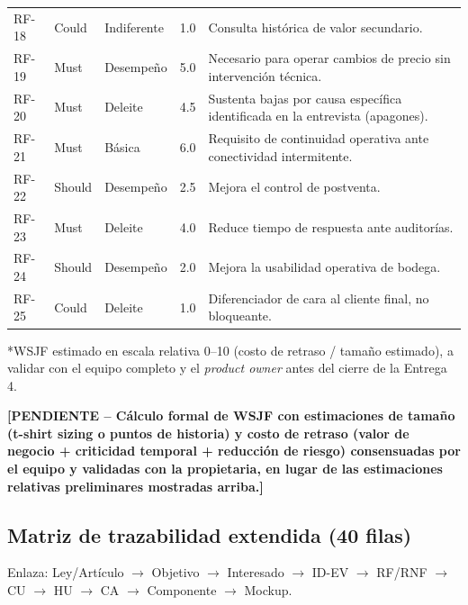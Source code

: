 \documentclass[11pt,a4paper]{article}
\newcommand{\PENDIENTE}[1]{\textcolor{pendiente}{\textbf{[PENDIENTE -- #1]}}}
\begin{document}
\begin{longtable}{|p{1.3cm}|p{1.5cm}|p{2.2cm}|p{1.6cm}|p{7.5cm}|}
RF-18 & Could & Indiferente & 1.0 & Consulta histórica de valor secundario. \\
RF-19 & Must & Desempeño & 5.0 & Necesario para operar cambios de precio sin intervención técnica. \\
RF-20 & Must & Deleite & 4.5 & Sustenta bajas por causa específica identificada en la entrevista (apagones). \\
RF-21 & Must & Básica & 6.0 & Requisito de continuidad operativa ante conectividad intermitente. \\
RF-22 & Should & Desempeño & 2.5 & Mejora el control de postventa. \\
RF-23 & Must & Deleite & 4.0 & Reduce tiempo de respuesta ante auditorías. \\
RF-24 & Should & Desempeño & 2.0 & Mejora la usabilidad operativa de bodega. \\
RF-25 & Could & Deleite & 1.0 & Diferenciador de cara al cliente final, no bloqueante. \\
\hline
\end{longtable}
\footnotesize{*WSJF estimado en escala relativa 0--10 (costo de retraso / tamaño estimado), a validar con el equipo completo y el \textit{product owner} antes del cierre de la Entrega 4.}

\PENDIENTE{Cálculo formal de WSJF con estimaciones de tamaño (t-shirt sizing o puntos de historia) y costo de retraso (valor de negocio + criticidad temporal + reducción de riesgo) consensuadas por el equipo y validadas con la propietaria, en lugar de las estimaciones relativas preliminares mostradas arriba.}

\subsection{Matriz de trazabilidad extendida (40 filas)}
Enlaza: Ley/Artículo $\to$ Objetivo $\to$ Interesado $\to$ ID-EV $\to$ RF/RNF $\to$ CU $\to$ HU $\to$ CA $\to$ Componente $\to$ Mockup.
\end{document}
